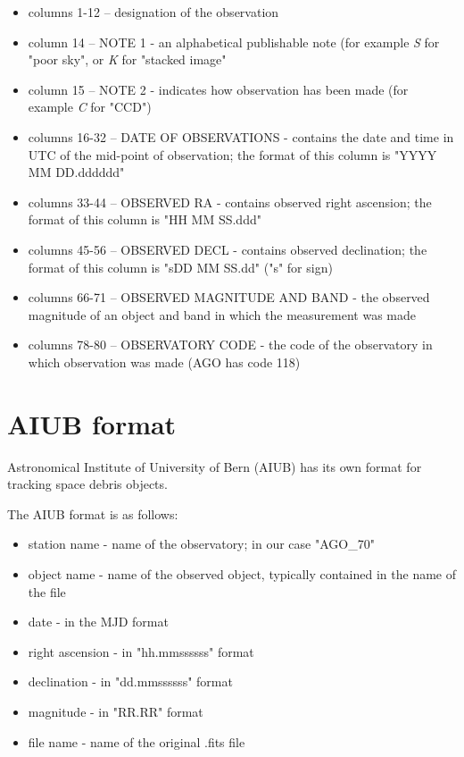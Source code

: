 	\begin{itemize}
		\item columns 1-12 -- designation of the observation
		\item column 14 -- NOTE 1 - an alphabetical publishable note (for example \emph{S} for "poor sky", or \emph{K} for "stacked image"
		\item column 15 -- NOTE 2 - indicates how observation has been made (for example \emph{C} for "CCD")
		\item columns 16-32 -- DATE OF OBSERVATIONS - contains the date and time in UTC of the mid-point of observation; the format of this column is "YYYY MM DD.dddddd"
		\item columns 33-44 -- OBSERVED RA - contains observed right ascension; the format of this column is "HH MM SS.ddd"
		\item columns 45-56 -- OBSERVED DECL - contains observed declination; the format of this column is "sDD MM SS.dd" ("s" for sign)
		\item columns 66-71 -- OBSERVED MAGNITUDE AND BAND - the observed magnitude of an object and band in which the measurement was made
		\item columns 78-80 -- OBSERVATORY CODE - the code of the observatory in which observation was made (AGO has code 118)
	\end{itemize}
	
\section{AIUB format}\label{sec:aiub}

	Astronomical Institute of University of Bern (AIUB) has its own format for tracking space debris objects.
	
	The AIUB format is as follows:
	
\begin{itemize}
	\item station name - name of the observatory; in our case "AGO\_70"
	\item object name - name of the observed object, typically contained in the name of the file
	\item date - in the MJD format
	\item right ascension - in "hh.mmssssss" format
	\item declination - in "dd.mmssssss" format
	\item magnitude - in "RR.RR" format
	\item file name - name of the original .fits file
\end{itemize}

